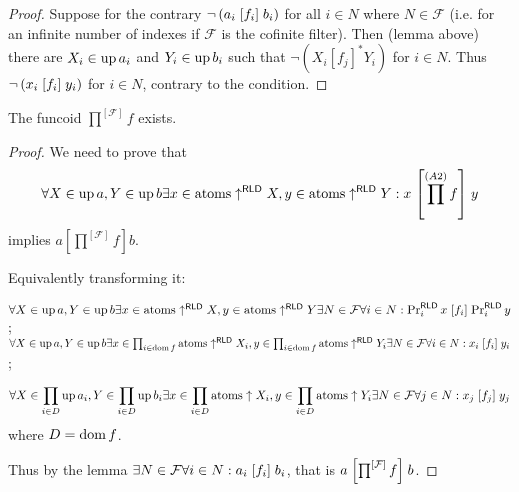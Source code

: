 \begin{proof}
  Suppose for the contrary $\neg \left( a_i \mathrel{\left[f_i\right]} b_i \right)$ for
  all $i \in N$ where $N \in \mathcal{F}$ (i.e. for an infinite number of
  indexes if $\mathcal{F}$ is the cofinite filter). Then (lemma above) there
  are $X_i \in \operatorname{up} a_i$ and $Y_i \in \operatorname{up} b_i$ such that $\neg
  \left( X_i \mathrel{[f_j]^{\ast}} Y_i \right)$ for $i \in N$. Thus $\neg
  \left( x_i \mathrel{\left[f_i\right]} y_i \right)$ for $i \in N$, contrary to the
  condition.
\end{proof}

\begin{prop}
  The funcoid $\prod^{[\mathcal{F}]} f$ exists.
\end{prop}

\begin{proof}
  We need to prove that
  \[ \forall X \in \operatorname{up} a, Y \in \operatorname{up} b \exists x \in \operatorname{atoms}
     \uparrow^{\mathsf{RLD}} X, y \in \operatorname{atoms}
     \uparrow^{\mathsf{RLD}} Y : x \mathrel{\left[ \prod^{(A 2)} f
     \right]} y \]
  implies $a \mathrel{\left[ \prod^{[\mathcal{F}]} f \right]} b$.
  
  Equivalently transforming it: 
  
  $\forall X \in \operatorname{up} a, Y \in \operatorname{up} b \exists x \in \operatorname{atoms}
  \uparrow^{\mathsf{RLD}} X, y \in \operatorname{atoms}
  \uparrow^{\mathsf{RLD}} Y \\  
  \exists N \in \mathcal{F} \forall i \in N : \Pr^{\mathsf{RLD}}_i x
  \mathrel{\left[f_i\right]} \Pr^{\mathsf{RLD}}_i y$; \\
  $\forall X \in \operatorname{up} a, Y \in \operatorname{up} b \exists x \in \prod_{i \in
  \operatorname{dom} f} \operatorname{atoms} \uparrow^{\mathsf{RLD}} X_i, y \in
  \prod_{i \in \operatorname{dom} f} \operatorname{atoms} \uparrow^{\mathsf{RLD}} Y_i \\  
  \exists N \in \mathcal{F} \forall i \in N : x_i \mathrel{\left[f_i\right]} y_i$;

  \[ \forall X \in \prod_{i \in D} \operatorname{up} a_i, Y \in \prod_{i \in D}
     \operatorname{up} b_i \exists x \in \prod_{i \in D} \mathrm{atoms} \uparrow X_i,
     y \in \prod_{i \in D} \mathrm{atoms} \uparrow Y_i \exists N \in
     \mathcal{F} \forall j \in N : x_j \mathrel{[f_j]} y_j \]
  where $D = \operatorname{dom} f$.
  
  Thus by the lemma $\exists N \in \mathcal{F} \forall i \in N : a_i
  \mathrel{\left[f_i\right]} b_i$, that is $a \mathrel{\left[\prod^{[\mathcal{F}]} f\right]} b$.
\end{proof}

